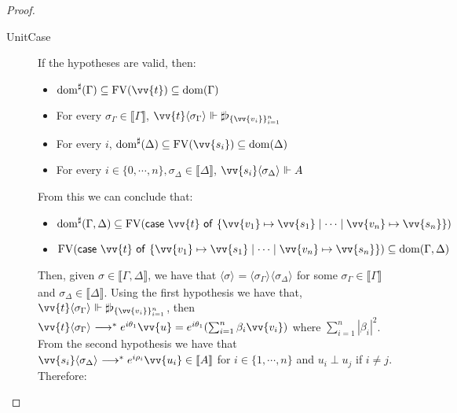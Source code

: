 \documentclass[runningheads,orivec,envcountsame,envcountsect]{llncs}
\newcommand\lra{\longrightarrow}
\newcommand\ansubst[2]{\ensuremath{\langle #1 \rangle_{#2}}}
\newcommand\dom[1]{\mathrm{dom}(#1)}
\newcommand\sdom[1]{\mathrm{dom}^{\sharp}(#1)}
\newcommand\FV[1]{\mathrm{FV}(#1)}
\def\gencase#1#2#3#4#5{\ensuremath{\mathsf{case}~#1~\mathsf{of}~\{#2\mapsto #4 \mid \dotsb \mid #3\mapsto #5\}}}
\def\eval{\lra^*}
\def\sem#1{\llbracket#1\rrbracket}
\def\real{\Vdash}
\newcommand\basis[1]{\ensuremath{\flat_{#1}}}
\newcommand\genbasis[3]{\ensuremath{\basis{\{#1\}_{#2}^{#3}}}}
\begin{document}
\begin{proof}
\begin{description}
    \item[UnitCase] If the hypotheses are valid, then:
    \begin{itemize}
        \item $\sdom{\Gamma}\subseteq \FV{\vv{t}}\subseteq \dom{\Gamma}$
        \item For every $\sigma_\Gamma\in\sem{\Gamma}$, $\vv{t}\ansubst{\sigma_\Gamma}{}\real\sharp\genbasis{\vv{v_i}}{i=1}{n}$
        \item For every $i$, $\sdom{\Delta}\subseteq \FV{\vv{s_i}}\subseteq \dom{\Delta}$
        \item For every $i\in\{0,\dotsb ,n\}, \sigma_\Delta\in\sem{\Delta}$, $\vv{s_i}\ansubst{\sigma_\Delta}{}\real A$
    \end{itemize}
    
    From this we can conclude that:
    
    \begin{itemize}
        \item $\sdom{\Gamma,\Delta}\subseteq \FV{\gencase{\vv{t}}{\vv{v_1}}{\vv{v_n}}{\vv{s_1}}{\vv{s_n}}}$
        \item $\FV{\gencase{\vv{t}}{\vv{v_1}}{\vv{v_n}}{\vv{s_1}}{\vv{s_n}}}\subseteq \dom{\Gamma,\Delta}$
    \end{itemize}
    
    Then, given $\sigma\in\sem{\Gamma,\Delta}$, we have that $\ansubst{\sigma}{}=\ansubst{\sigma_\Gamma}{}\ansubst{\sigma_\Delta}{}$ for some $\sigma_\Gamma\in\sem{\Gamma}$ and $\sigma_\Delta\in\sem{\Delta}$. Using the first hypothesis we have that, $\vv{t}\ansubst{\sigma_\Gamma}{}\real\sharp\genbasis{\vv{v_i}}{i=1}{n}$, then $\vv{t}\ansubst{\sigma_\Gamma}{}\eval e^{i\theta_1} \vv{u}=e^{i\theta_1} (\sum_{i=1}^{n}\beta_i \vv{v_i})$ where $\sum_{i=1}^{n}|\beta_i|^2$. From the second hypothesis we have that $\vv{s_i}\ansubst{\sigma_\Delta}{}\eval e^{i\rho_i} \vv{u_i}\in\sem{A}$ for $i\in\{1,\dotsb ,n\}$ and $u_i\perp u_j$ if $i\neq j$. Therefore:


\end{description}
\end{proof}
\end{document}

